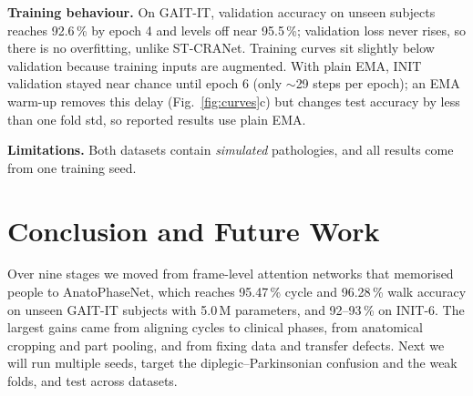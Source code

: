 \documentclass[conference]{IEEEtran}
\begin{document}
\textbf{Training behaviour.} On GAIT-IT, validation accuracy on unseen
subjects reaches 92.6\,\% by epoch 4 and levels off near 95.5\,\%; validation
loss never rises, so there is no overfitting, unlike ST-CRANet. Training curves
sit slightly below validation because training inputs are augmented. With plain
EMA, INIT validation stayed near chance until epoch 6 (only $\sim$29 steps per
epoch); an EMA warm-up removes this delay (Fig.~\ref{fig:curves}c) but changes
test accuracy by less than one fold std, so reported results use plain EMA.

\textbf{Limitations.} Both datasets contain \emph{simulated} pathologies, and
all results come from one training seed.

\section{Conclusion and Future Work}
Over nine stages we moved from frame-level attention networks that memorised
people to AnatoPhaseNet, which reaches 95.47\,\% cycle and 96.28\,\% walk
accuracy on unseen GAIT-IT subjects with 5.0\,M parameters, and 92--93\,\% on
INIT-6. The largest gains came from aligning cycles to clinical phases, from
anatomical cropping and part pooling, and from fixing data and transfer
defects. Next we will run multiple seeds, target the diplegic--Parkinsonian
confusion and the weak folds, and test across datasets.
\end{document}
